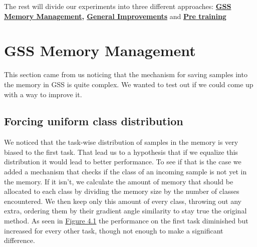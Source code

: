 \documentclass[oneside]{ctuthesis}
\begin{document}
The rest  will divide our experiments into three different approaches: \textbf{\hyperref[sec:expone]{GSS Memory Management}, \hyperref[sec:exptwo]{General Improvements}} and \textbf{\hyperref[sec:expthree]{Pre training}}

\section{GSS Memory Management}
\label{sec:expone}
This section came from us noticing that the mechanism for saving samples into the memory in GSS is quite complex. We wanted to test out if we could come up with a way to improve it.

\subsection{Forcing uniform class distribution}
We noticed that the task-wise distribution of samples in the memory is very biased to the first task. That lead us to a hypothesis that if we equalize this distribution it would lead to better performance. To see if that is the case we added a mechanism that checks if the class of an incoming sample is not yet in the memory. If it isn't, we calculate the amount of memory that should be allocated to each class by dividing the memory size by the number of classes encountered. We then keep only this amount of every class, throwing out any extra, ordering them by their gradient angle similarity to stay true the original method.
As seen in \hyperref[fig:gss-cifar10-grid]{Figure 4.1} the performance on the first task diminished but increased for every other task, though not enough to make a significant difference. 
\end{document}
